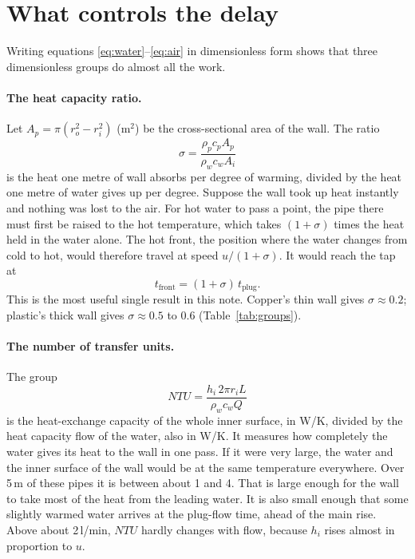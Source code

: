 \documentclass[a4paper,justified]{tufte-handout}
\newcommand{\lpm}{\,l/min}
\begin{document}
\section{What controls the delay}

Writing equations \eqref{eq:water}--\eqref{eq:air} in dimensionless form shows
that three dimensionless groups do almost all the work.

\paragraph{The heat capacity ratio.} Let $A_p=\pi(r_o^2-r_i^2)$ (m$^2$) be the
cross-sectional area of the wall. The ratio
\begin{equation}
  \sigma = \frac{\rho_p c_p A_p}{\rho_w c_w A_i}
\end{equation}
is the heat one metre of wall absorbs per degree of warming, divided by the
heat one metre of water gives up per degree. Suppose the wall took up heat
instantly and nothing was lost to the air. For hot water to pass a point, the
pipe there must first be raised to the hot temperature, which takes
$(1+\sigma)$ times the heat held in the water alone. The hot front, the
position where the water changes from cold to hot, would therefore travel at
speed $u/(1+\sigma)$. It would reach the tap at
\begin{equation}
  t_{\text{front}} = (1+\sigma)\,t_{\text{plug}} .
  \label{eq:front}
\end{equation}
This is the most useful single result in this note. Copper's thin wall gives
$\sigma\approx0.2$; plastic's thick wall gives $\sigma\approx0.5$ to 0.6
(Table~\ref{tab:groups}).

\paragraph{The number of transfer units.} The group
\begin{equation}
  NTU = \frac{h_i\,2\pi r_i L}{\rho_w c_w Q}
\end{equation}
is the heat-exchange capacity of the whole inner surface, in W/K, divided by
the heat capacity flow of the water, also in W/K. It measures how completely
the water gives its heat to the wall in one pass. If it were very large, the
water and the inner surface of the wall would be at the same temperature
everywhere. Over 5\,m of these pipes it is between about 1 and 4. That is large
enough for the wall to take most of the heat from the leading water. It is also
small enough that some slightly warmed water arrives at the plug-flow time, ahead
of the main rise. Above about 2\lpm{}, $NTU$ hardly changes with flow, because
$h_i$ rises almost in proportion to $u$.
\end{document}
